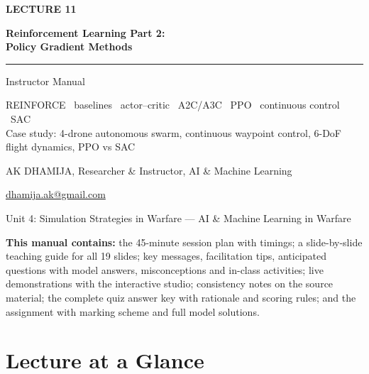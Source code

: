 \documentclass[11pt]{article}
\begin{document}
\begin{titlepage}\centering\vspace*{2.2cm}
{\color{AccN}\large\bfseries LECTURE 11\par}\vspace{0.6cm}
{\color{NavyN}\Huge\bfseries Reinforcement Learning Part 2:\\Policy Gradient Methods\par}\vspace{0.6cm}
{\color{AccN}\rule{0.7\textwidth}{1.5pt}}\par\vspace{0.6cm}
{\LARGE Instructor Manual\par}\vspace{0.4cm}
{\large\begin{minipage}{0.85\textwidth}\centering REINFORCE \textbullet\ baselines \textbullet\ actor--critic \textbullet\ A2C/A3C \textbullet\ PPO \textbullet\ continuous control \textbullet\ SAC\\Case study: 4-drone autonomous swarm, continuous waypoint control, 6-DoF flight dynamics, PPO vs SAC\end{minipage}\par}\vspace{2cm}
{\large AK DHAMIJA, Researcher \& Instructor, AI \& Machine Learning\par}\vspace{0.2cm}
{\normalsize \href{mailto:dhamija.ak@gmail.com}{dhamija.ak@gmail.com} \quad\textbullet{}\par}\vspace{0.3cm}
{Unit 4: Simulation Strategies in Warfare --- AI \& Machine Learning in Warfare\par}\vfill
\begin{tcolorbox}[colback=NavyN!4,colframe=NavyN,boxrule=0.6pt,arc=2pt,width=0.9\textwidth]\small
\textbf{This manual contains:} the 45-minute session plan with timings; a slide-by-slide teaching guide for all 19 slides; key messages, facilitation tips, anticipated questions with model answers, misconceptions and in-class activities; live demonstrations with the interactive studio; consistency notes on the source material; the complete quiz answer key with rationale and scoring rules; and the assignment with marking scheme and full model solutions.
\end{tcolorbox}
\end{titlepage}
\tableofcontents\newpage


\section{Lecture at a Glance}
\end{document}

